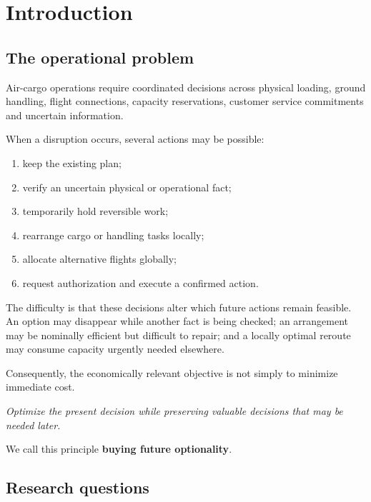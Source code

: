 \documentclass[10pt,a4paper]{article}
\theoremstyle{plain}
\theoremstyle{definition}
\theoremstyle{remark}
\begin{document}
\section{Introduction}

\subsection{The operational problem}

Air-cargo operations require coordinated decisions
across physical loading, ground handling,
flight connections, capacity reservations,
customer service commitments and uncertain information.

When a disruption occurs, several actions may be possible:

\begin{enumerate}[
  label=(\roman*),
  leftmargin=18pt,
  itemsep=2pt
]
\item keep the existing plan;
\item verify an uncertain physical or operational fact;
\item temporarily hold reversible work;
\item rearrange cargo or handling tasks locally;
\item allocate alternative flights globally;
\item request authorization and execute a confirmed action.
\end{enumerate}

The difficulty is that these decisions alter
which future actions remain feasible.
An option may disappear while another fact is being
checked; an arrangement may be nominally efficient
but difficult to repair; and a locally optimal reroute
may consume capacity urgently needed elsewhere.

Consequently, the economically relevant objective is not
simply to minimize immediate cost.

\begin{center}
\textit{\color{Navy}
Optimize the present decision while preserving
valuable decisions that may be needed later.
}
\end{center}

We call this principle
\textbf{buying future optionality}.

\subsection{Research questions}
\end{document}
